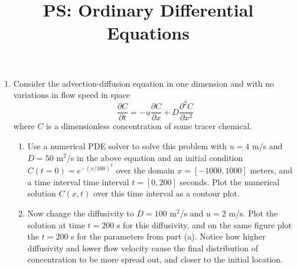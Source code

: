 \documentclass{article}
\title{\vspace{-1in} PS: Ordinary Differential Equations}
\date{}
\newcommand{\be}{\begin{enumerate}}
\newcommand{\ee}{\end{enumerate}}
\begin{document}
\maketitle
\be 
\item Consider the advection-diffusion equation in one dimension and with no variations in flow speed in space
\begin{equation}
\frac{\partial C}{\partial t} = -u \frac{\partial C}{\partial x} + D \frac{\partial^2 C}{\partial x^2}
\end{equation}
where $C$ is a dimensionless concentration of some tracer chemical.
\be
\item Use a numerical PDE solver to solve this problem with $u = 4$ m/s and $D = 50$ m$^2$/s in the above equation and an initial condition $C(t=0) = e^{-(x/100)^2}$ over the domain $x = [-1000, 1000]$ meters, and a time interval time interval $t = [0, 200]$ seconds. Plot the numerical solution $C(x,t)$ over this time interval as a contour plot.

\item Now change the diffusivity to $D = 100$ m$^2$/s and $u = 2$ m/s. Plot the solution at time $t=200$ s for this diffusivity, and on the same figure plot the $t=200$ s for the parameters from part (a). Notice how higher diffusivity and lower flow velocity cause the final distribution of concentration to be more spread out, and closer to the initial location.


\ee



\ee
\end{document}
